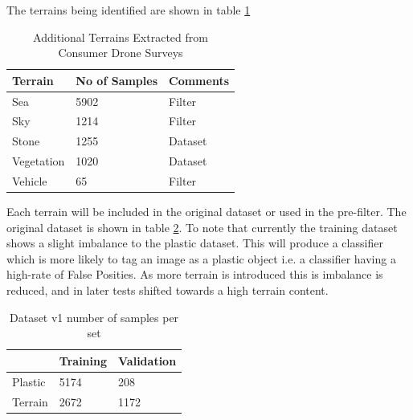 \documentclass{IEEEtran}
\begin{document}
The terrains being identified are shown in table \ref{table:addons}

\begin{table}[ht]
\centering
\caption{Additional Terrains Extracted from Consumer Drone Surveys}
\label{table:addons}
\begin{tabular}{lll} 
\hline
\textbf{Terrain} & \textbf{No of Samples} & \textbf{Comments}  \\ 
\hline
Sea              & 5902                   & Filter             \\
Sky              & 1214                   & Filter             \\
Stone            & 1255                   & Dataset            \\
Vegetation       & 1020                   & Dataset            \\
Vehicle          & 65                     & Filter            
\end{tabular}
\end{table}

Each terrain will be included in the original dataset or used in the pre-filter. The original dataset is shown in table \ref{table:original}. To note that currently the training dataset shows a slight imbalance to the plastic dataset. This will produce a classifier which is more likely to tag an image as a plastic object i.e. a classifier having a high-rate of False Posities. As more terrain is introduced this is imbalance is reduced, and in later tests shifted towards a high terrain content.
 
\begin{table}[ht]
\centering
\caption{Dataset v1 number of samples per set}
\label{table:original}
\begin{tabular}{lll} 
\hline
        & \textbf{Training} & \textbf{Validation}  \\ 
\hline
Plastic & 5174              & 208                  \\
Terrain & 2672              & 1172                
\end{tabular}
\end{table}
\end{document}
